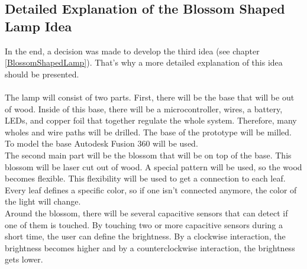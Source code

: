 \documentclass[04_projectProcess.tex]{subfiles}
\begin{document}
    \subsection{Detailed Explanation of the Blossom Shaped Lamp Idea}
        \begin{flushleft}
            In the end, a decision was made to develop the third idea (see chapter \ref{BlossomShapedLamp}). 
            That's why a more detailed explanation of this idea should be presented. \\~\\

            The lamp will consist of two parts. First, there will be the base that will be out of 
            wood. Inside of this base, there will be a microcontroller, wires, a battery, LEDs, and
            copper foil that together regulate the whole system. Therefore, many wholes and wire 
            paths will be drilled. The base of the prototype will be milled. To model the base 
            Autodesk Fusion 360\cite{autodeskFusion360} will be used.\\

            The second main part will be the blossom that will be on top of the base. This blossom
            will be laser cut out of wood. A special pattern will be used, so the wood becomes flexible.
            This flexibility will be used to get a connection to each leaf. Every leaf defines a 
            specific color, so if one isn't connected anymore, the color of the light will change. \\

            Around the blossom, there will be several capacitive sensors that can detect if one of them 
            is touched. By touching two or more capacitive sensors during a short time, the user can 
            define the brightness. By a clockwise interaction, the brightness becomes higher and 
            by a counterclockwise interaction, the brightness gets lower. \\
        \end{flushleft}
\end{document}
